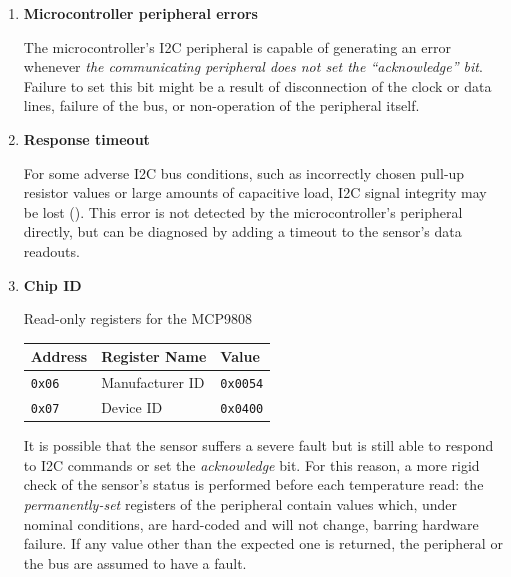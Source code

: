 \documentclass[a4paper,nobib,final]{tufte-book}
\begin{document}
\begin{enumerate}
	\item \textbf{Microcontroller peripheral errors}
	
	The microcontroller's \ac{I2C} peripheral is capable of generating an error whenever \emph{the communicating peripheral does not set the ``acknowledge'' bit}. Failure to set this bit might be a result of disconnection of the clock or data lines, failure of the bus, or non-operation of the peripheral itself.
	
	\item \textbf{Response timeout}
	
	For some adverse \ac{I2C} bus conditions, such as incorrectly chosen pull-up resistor values or large amounts of capacitive load, \ac{I2C} signal integrity may be lost (). This error is not detected by the microcontroller's peripheral directly, but can be diagnosed by adding a timeout to the sensor's data readouts.
	
	\item \textbf{Chip ID}
	
	\begin{margintable}
		\centering
		\caption{Read-only registers for the MCP9808}
		\label{tab:mcp9808readonly}
		\begin{tabularx}{\linewidth}{@{}lXl@{}}
			\toprule
			Address & Register Name & Value \\ \midrule
			\texttt{0x06} & Manufacturer ID & \texttt{0x0054} \\
			\texttt{0x07} & Device ID & \texttt{0x0400} \\ \bottomrule
		\end{tabularx}
	\end{margintable}
	
	It is possible that the sensor suffers a severe fault but is still able to respond to \ac{I2C} commands or set the \emph{acknowledge} bit. For this reason, a more rigid check of the sensor's status is performed before each temperature read: the \emph{permanently-set} registers of the peripheral contain values which, under nominal conditions, are hard-coded and will not change, barring hardware failure. If any value other than the expected one is returned, the peripheral or the bus are assumed to have a fault.
\end{enumerate}
\end{document}
